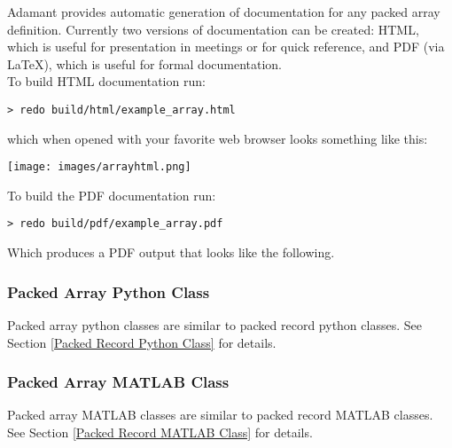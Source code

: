 Adamant provides automatic generation of documentation for any packed array definition. Currently two versions of documentation can be created: HTML, which is useful for presentation in meetings or for quick reference, and PDF (via \LaTeX), which is useful for formal documentation.\\

To build HTML documentation run:

\vspace{5mm} %
\begin{verbatim}
> redo build/html/example_array.html
\end{verbatim}
\vspace{5mm} %

which when opened with your favorite web browser looks something like this:

\vspace{5mm} %
\texttt{[image: images/arrayhtml.png]}
\vspace{5mm} %

To build the PDF documentation run:

\vspace{5mm} %
\begin{verbatim}
> redo build/pdf/example_array.pdf
\end{verbatim}
\vspace{5mm} %

Which produces a PDF output that looks like the following. \\

\noindent\makebox[\linewidth]{\rule{\textwidth}{0.4pt}}

\noindent\makebox[\linewidth]{\rule{\textwidth}{0.4pt}}

\subsubsection{Packed Array Python Class}

Packed array python classes are similar to packed record python classes. See Section \ref{Packed Record Python Class} for details.

\subsubsection{Packed Array MATLAB Class}

Packed array MATLAB classes are similar to packed record MATLAB classes. See Section \ref{Packed Record MATLAB Class} for details.

